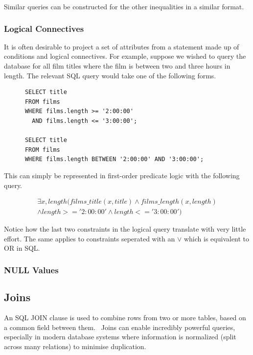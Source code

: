 \documentclass[a4paper, 11pt]{article}
\begin{document}
      Similar queries can be constructed for the other inequalities in a
      similar format.

    \subsubsection{Logical Connectives}

      It is often desirable to project a set of attributes from a statement
      made up of conditions and logical connectives. For example, suppose we
      wished to query the database for all film titles where the film is between 
      two and three hours in length. The relevant SQL query would take one of
      the following forms.

      \begin{verbatim}
      SELECT title
      FROM films
      WHERE films.length >= '2:00:00'
        AND films.length <= '3:00:00';

      SELECT title
      FROM films
      WHERE films.length BETWEEN '2:00:00' AND '3:00:00';
      \end{verbatim}

      This can simply be represented in first-order predicate logic with the
      following query.

      \begin{gather}
        \exists x, length(films\_title(x, title) \land films\_length(x,
        length)\\
        \land length >= '2:00:00' \land length <= '3:00:00')
      \end{gather}

      Notice how the last two constraints in the logical query translate
      with very little effort. The same applies to constraints seperated with
      an $\lor$ which is equivalent to OR in SQL.

    \subsubsection{NULL Values}


  \subsection{Joins}
    \label{sec:joins}

    An SQL JOIN clause is used to combine rows from two or more tables, based
    on a common field between them.~\cite{w3JOINS} Joins can enable incredibly
    powerful queries, especially in modern database systems where information
    is normalized (split across many relations) to minimise duplication.
\end{document}
